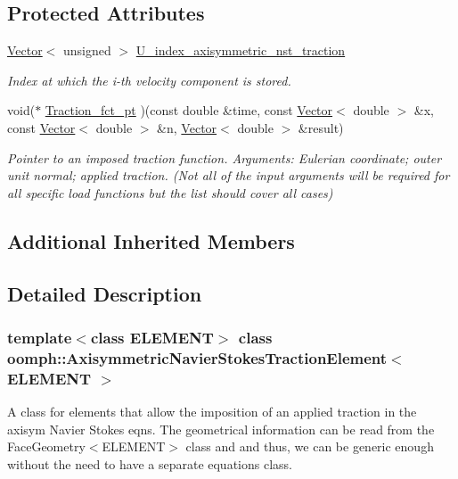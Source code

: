 \subsection*{Protected Attributes}
\begin{DoxyCompactItemize}
\item 
\hyperlink{classoomph_1_1Vector}{Vector}$<$ unsigned $>$ \hyperlink{classoomph_1_1AxisymmetricNavierStokesTractionElement_a4c74bd4d437c216afeff3ac93ea3a9ec}{U\+\_\+index\+\_\+axisymmetric\+\_\+nst\+\_\+traction}
\begin{DoxyCompactList}\small\item\em Index at which the i-\/th velocity component is stored. \end{DoxyCompactList}\item 
void($\ast$ \hyperlink{classoomph_1_1AxisymmetricNavierStokesTractionElement_a58840e83c766a6e7d653f389c2c54dfc}{Traction\+\_\+fct\+\_\+pt} )(const double \&time, const \hyperlink{classoomph_1_1Vector}{Vector}$<$ double $>$ \&x, const \hyperlink{classoomph_1_1Vector}{Vector}$<$ double $>$ \&n, \hyperlink{classoomph_1_1Vector}{Vector}$<$ double $>$ \&result)
\begin{DoxyCompactList}\small\item\em Pointer to an imposed traction function. Arguments\+: Eulerian coordinate; outer unit normal; applied traction. (Not all of the input arguments will be required for all specific load functions but the list should cover all cases) \end{DoxyCompactList}\end{DoxyCompactItemize}
\subsection*{Additional Inherited Members}


\subsection{Detailed Description}
\subsubsection*{template$<$class E\+L\+E\+M\+E\+NT$>$\newline
class oomph\+::\+Axisymmetric\+Navier\+Stokes\+Traction\+Element$<$ E\+L\+E\+M\+E\+N\+T $>$}

A class for elements that allow the imposition of an applied traction in the axisym Navier Stokes eqns. The geometrical information can be read from the Face\+Geometry$<$\+E\+L\+E\+M\+E\+N\+T$>$ class and and thus, we can be generic enough without the need to have a separate equations class. 

